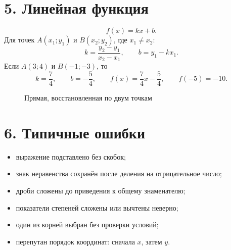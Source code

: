 \documentclass[a4paper,12pt]{article}
\begin{document}
\section*{5. Линейная функция}
\[
f(x)=kx+b.
\]
Для точек $A(x_1;y_1)$ и $B(x_2;y_2)$, где $x_1\ne x_2$:
\[
k=\frac{y_2-y_1}{x_2-x_1},\qquad b=y_1-kx_1.
\]
Если $A(3;4)$ и $B(-1;-3)$, то
\[
k=\frac74,\qquad b=-\frac54,
\qquad f(x)=\frac74x-\frac54,
\qquad f(-5)=-10.
\]
\begin{figure}[ht]\centering
{}
\caption{Прямая, восстановленная по двум точкам}
\end{figure}
\section*{6. Типичные ошибки}
\begin{itemize}
\item выражение подставлено без скобок;
\item знак неравенства сохранён после деления на отрицательное число;
\item дроби сложены до приведения к общему знаменателю;
\item показатели степеней сложены или вычтены неверно;
\item один из корней выбран без проверки условий;
\item перепутан порядок координат: сначала $x$, затем $y$.
\end{itemize}
\clearpage
\end{document}
